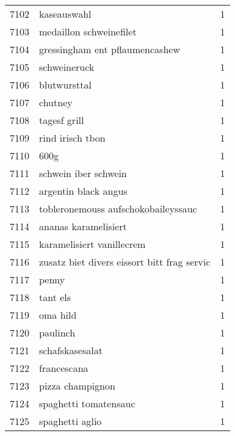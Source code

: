 \begin{tabular}{llr}
7102 &                                        kaseauswahl &      1 \\
7103 &                            medaillon schweinefilet &      1 \\
7104 &                     gressingham ent pflaumencashew &      1 \\
7105 &                                       schweineruck &      1 \\
7106 &                                       blutwursttal &      1 \\
7107 &                                            chutney &      1 \\
7108 &                                       tagesf grill &      1 \\
7109 &                                   rind irisch tbon &      1 \\
7110 &                                               600g &      1 \\
7111 &                               schwein iber schwein &      1 \\
7112 &                               argentin black angus &      1 \\
7113 &                tobleronemouss aufschokobaileyssauc &      1 \\
7114 &                               ananas karamelisiert &      1 \\
7115 &                          karamelisiert vanillecrem &      1 \\
7116 &        zusatz biet divers eissort bitt frag servic &      1 \\
7117 &                                              penny &      1 \\
7118 &                                           tant els &      1 \\
7119 &                                           oma hild &      1 \\
7120 &                                           paulinch &      1 \\
7121 &                                    schafskasesalat &      1 \\
7122 &                                        francescana &      1 \\
7123 &                                   pizza champignon &      1 \\
7124 &                              spaghetti tomatensauc &      1 \\
7125 &                                    spaghetti aglio &      1 \\

\end{tabular}
